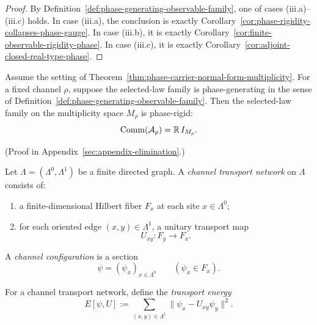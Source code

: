 \begin{proof}
By Definition~\ref{def:phase-generating-observable-family}, one of cases
(iii.a)--(iii.c) holds. In case (iii.a), the conclusion is exactly
Corollary~\ref{cor:phase-rigidity-collapses-phase-gauge}. In case (iii.b), it
is exactly Corollary~\ref{cor:finite-observable-rigidity-phase}. In case
(iii.c), it is exactly Corollary~\ref{cor:adjoint-closed-real-type-phase}.
\end{proof}

\begin{corollary}
\label{cor:phase-generation-forces-phase-rigidity}
Assume the setting of
Theorem~\ref{thm:phase-carrier-normal-form-multiplicity}. For a fixed channel
$\rho$, suppose the selected-law family is phase-generating in the sense of
Definition~\ref{def:phase-generating-observable-family}. Then the selected-law
family on the multiplicity space $M_{\rho}$ is phase-rigid:
\[
\mathrm{Comm}(\mathcal A_{\rho})=\mathbb{R}\,I_{M_{\rho}}.
\]
\end{corollary}

(Proof in Appendix~\ref{sec:appendix-elimination}.)

\begin{definition}
\label{def:channel-transport-network}
Let $\Lambda=(\Lambda^0,\Lambda^1)$ be a finite directed graph. A
\emph{channel transport network} on $\Lambda$ consists of:
\begin{enumerate}[label=(\roman*), leftmargin=2em, itemsep=0.2em]
\item a finite-dimensional Hilbert fiber $F_x$ at each site $x\in\Lambda^0$;
\item for each oriented edge $(x,y)\in\Lambda^1$, a unitary transport map
      \[
      U_{xy}:F_y\to F_x.
      \]
\end{enumerate}
A \emph{channel configuration} is a section
\[
\psi=(\psi_x)_{x\in\Lambda^0}
\qquad
(\psi_x\in F_x).
\]
\end{definition}

\begin{definition}
\label{def:channel-transport-energy}
For a channel transport network, define the \emph{transport energy}
\[
E[\psi,U]
:=
\sum_{(x,y)\in\Lambda^1}\|\psi_x-U_{xy}\psi_y\|^2.
\]
\end{definition}

